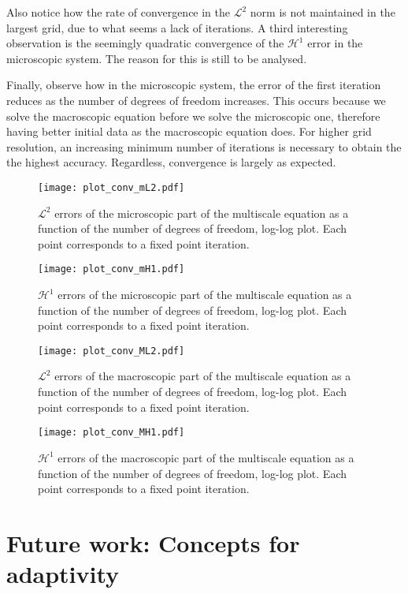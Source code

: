 \documentclass{article}
\renewcommand{\L}{\mathcal{ L}}
\renewcommand{\H}{\mathcal{ H}}
\begin{document}
Also notice how the rate of convergence in the $\L^2$ norm is not maintained in the largest grid, due to what seems a lack of iterations.
A third interesting observation is the seemingly quadratic convergence of the $\H^1$ error in the microscopic system. The reason for this is still to be analysed.

Finally, observe how in the microscopic system, the error of the first iteration reduces as the number of degrees of freedom increases. This occurs because we solve the macroscopic equation before we solve the microscopic one, therefore having better initial data as the macroscopic equation does.
For higher grid resolution, an increasing minimum number of iterations is necessary to obtain the the highest accuracy. Regardless, convergence is largely as expected.
\begin{figure}[ht]
    \centering
    \texttt{[image: plot\_conv\_mL2.pdf]}
    \caption{$\L^2$ errors of the microscopic part of the multiscale equation as a function of the number of degrees of freedom, log-log plot. Each point corresponds to a fixed point iteration.}
    \label{fig:mL2}
\end{figure}
\begin{figure}[ht]
    \centering
    \texttt{[image: plot\_conv\_mH1.pdf]}
    \caption{$\H^1$ errors of the microscopic part of the multiscale equation as a function of the number of degrees of freedom, log-log plot. Each point corresponds to a fixed point iteration.}
    \label{fig:mH1}
\end{figure}
\begin{figure}[ht]
    \centering
    \texttt{[image: plot\_conv\_ML2.pdf]}
    \caption{$\L^2$ errors of the macroscopic part of the multiscale equation as a function of the number of degrees of freedom, log-log plot. Each point corresponds to a fixed point iteration.}
    \label{fig:ML2}
\end{figure}

\begin{figure}[ht]
    \centering
    \texttt{[image: plot\_conv\_MH1.pdf]}
    \caption{$\H^1$ errors of the macroscopic part of the multiscale equation as a function of the number of degrees of freedom, log-log plot. Each point corresponds to a fixed point iteration.}
    \label{fig:MH1}
\end{figure}


\section{Future work: Concepts for adaptivity}
\label{sec:adaptivity}
\end{document}
